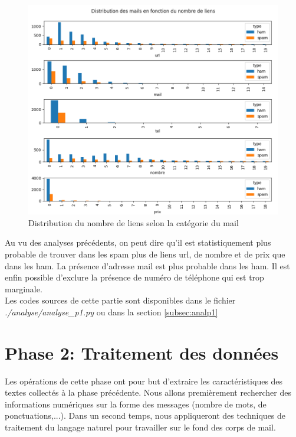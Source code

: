 \documentclass[a4paper,12pt]{article}
\begin{document}
			\begin{figure}[H]
				\includegraphics[width=\linewidth]{img/P1feat.png}
				\caption{Distribution du nombre de liens selon la catégorie du mail}
			\end{figure}
			
			
			Au vu des analyses précédents, on peut dire qu'il est statistiquement plus probable de trouver dans les spam plus de liens url, de nombre et de prix que dans les ham. La présence d'adresse mail est plus probable dans les ham. Il est enfin possible d'exclure la présence de numéro de téléphone qui est trop marginale.\\
			
			Les codes sources de cette partie sont disponibles dans le fichier \emph{./analyse/analyse\_p1.py} ou dans la section \ref{subsec:analp1}
			
			
			
 
	
\newpage
\section{Phase 2: Traitement des données}
	Les opérations de cette phase ont pour but d'extraire les caractéristiques des textes collectés à la phase précédente. 
	Nous allons premièrement rechercher des informations numériques sur la forme des messages (nombre de mots, de ponctuations,...).  
	Dans un second temps, nous appliqueront des techniques de traitement du langage naturel pour travailler sur le fond des corps de mail. 
	
\end{document}
